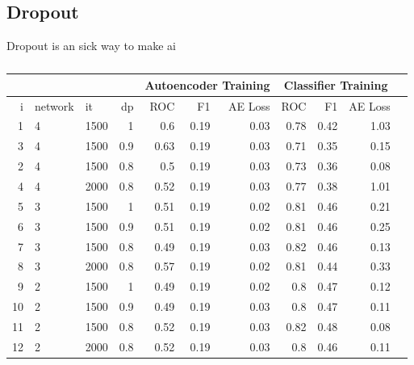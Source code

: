 \subsection{Dropout}
Dropout is an sick way to make ai
\begin{table}[!h] \centering
{\small
\begin{tabular}{rllrrrrrrrr}
  &&& &  \multicolumn{3}{|c|}{Autoencoder Training} &  \multicolumn{3}{c|}{Classifier Training}    \\
\hline
   i & network             &   it &   dp &   ROC&F1&AE Loss & ROC & F1 & AE Loss \\
\hline
   1 & 4 & 1500 &  1   &    0.6  &   0.19 &     0.03 &    0.78 &   0.42 &     1.03 \\
   3 & 4 & 1500 &  0.9 &    0.63 &   0.19 &     0.03 &    0.71 &   0.35 &     0.15 \\
   2 & 4 & 1500 &  0.8 &    0.5  &   0.19 &     0.03 &    0.73 &   0.36 &     0.08 \\
\hline
   4 & 4 & 2000 &  0.8 &    0.52 &   0.19 &     0.03 &    0.77 &   0.38 &     1.01 \\
\hline
   5 & 3 & 1500 &  1   &    0.51 &   0.19 &     0.02 &    0.81 &   0.46 &     0.21 \\
   6 & 3 & 1500 &  0.9 &    0.51 &   0.19 &     0.02 &    0.81 &   0.46 &     0.25 \\
   7 & 3 & 1500 &  0.8 &    0.49 &   0.19 &     0.03 &    0.82 &   0.46 &     0.13 \\
\hline
   8 & 3 & 2000 &  0.8 &    0.57 &   0.19 &     0.02 &    0.81 &   0.44 &     0.33 \\
\hline
   9 & 2  & 1500 &  1   &    0.49 &   0.19 &     0.02 &    0.8  &   0.47 &     0.12 \\
  10 & 2  & 1500 &  0.9 &    0.49 &   0.19 &     0.03 &    0.8  &   0.47 &     0.11 \\
  11  & 2 & 1500 &  0.8 &    0.52 &   0.19 &     0.03 &    0.82 &   0.48 &     0.08 \\
\hline
  12  & 2 & 2000 &  0.8 &    0.52 &   0.19 &     0.03 &    0.8  &   0.46 &     0.11 \\
\hline
\end{tabular}}\caption{} \label{tab:pseaafasfrch} \end{table}


\newpage
%
%
%
%
%
%
